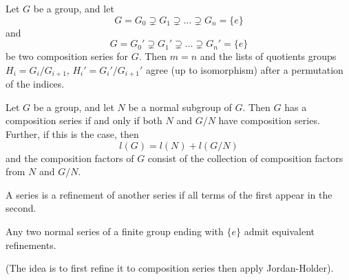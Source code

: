 \documentclass[openany]{book}
\begin{document}
\begin{thm}
    Let $G$ be a group, and let 
    \begin{equation*}
        G=G_0\supsetneq G_1\supsetneq\dots\supsetneq G_n=\{e\}
    \end{equation*}
    and 
    \begin{equation*}
        G=G_0'\supsetneq G_1'\supsetneq\dots\supsetneq G_n'=\{e\}
    \end{equation*}
    be two composition series for $G$. Then $m=n$ and the lists of quotients groups $H_i=G_i/G_{i+1}$, $H_i'=G_i'/G_{i+1}'$ agree (up to isomorphism) after a permutation of the indices.
\end{thm}
\begin{prop}
    Let $G$ be a group, and let $N$ be a normal subgroup of $G$. Then $G$ has a composition series if and only if both $N$ and $G/N$ have composition series. Further, if this is the case, then 
    \begin{equation*}
        l(G)=l(N)+l(G/N)
    \end{equation*}
    and the composition factors of $G$ consist of the collection of composition factors from $N$ and $G/N$.
\end{prop}
\begin{defn}[refinement]
    A series is a refinement of another series if all terms of the first appear in the second.
\end{defn}
\begin{prop}
    Any two normal series of a finite group ending with $\{e\}$ admit equivalent refinements.

    (The idea is to first refine it to composition series then apply Jordan-Holder).
\end{prop}
\end{document}
